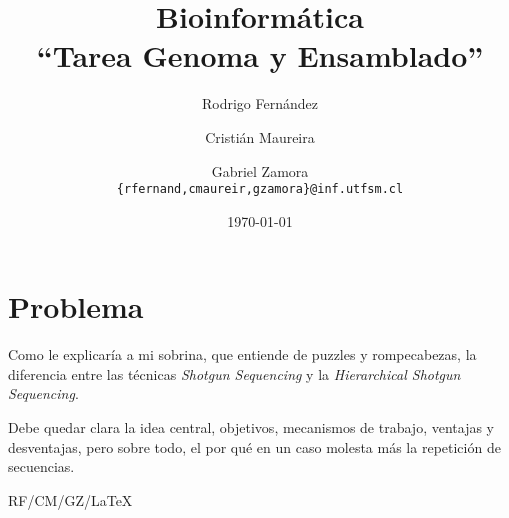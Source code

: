 \documentclass[letter, 10pt]{article}
\begin{document}


\title{Bioinformática\\``Tarea Genoma y Ensamblado''}
\author{Rodrigo Fernández \and Cristián Maureira \and Gabriel Zamora\\\texttt{\{rfernand,cmaureir,gzamora\}@inf.utfsm.cl}}
\date{\today}
\maketitle

\section{Problema}
Como le explicaría a mi sobrina, que entiende de puzzles y rompecabezas,
la diferencia entre las técnicas \emph{Shotgun Sequencing} y la \emph{Hierarchical
Shotgun Sequencing}.

Debe quedar clara la idea central, objetivos, mecanismos de trabajo,
ventajas y desventajas, pero sobre todo, el por qué en un caso molesta más
la repetición de secuencias.

\vfill\hfill
RF/CM/GZ/\LaTeX
\end{document}
